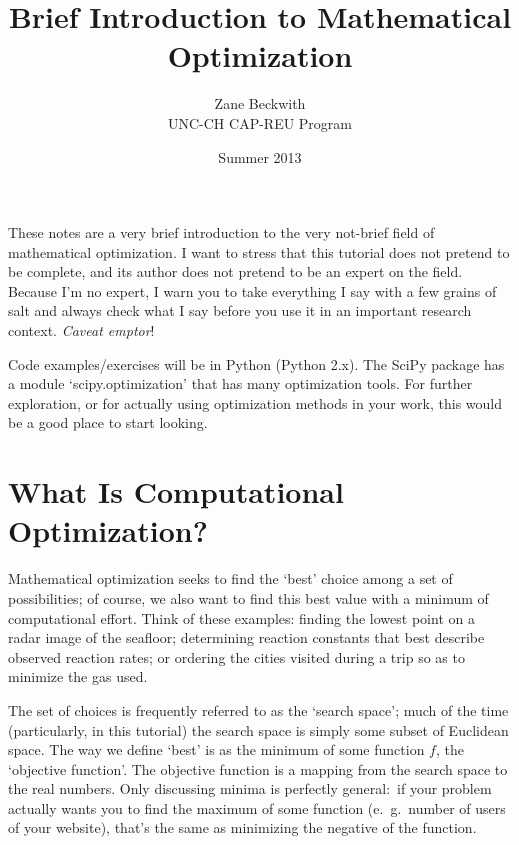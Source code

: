 \documentclass{article}
\begin{document}
\title{Brief Introduction to Mathematical Optimization}
\author{Zane Beckwith \\
UNC-CH CAP-REU Program}
\date{Summer 2013}
\maketitle

These notes are a very brief introduction to the very not-brief field of 
mathematical optimization. I want to stress that this tutorial does not
pretend to be complete, and its author does not pretend to be an expert
on the field. Because I'm no expert, I warn you to take everything I say
with a few grains of salt and always check what I say before you use
it in an important research context. \textit{Caveat emptor}!


Code examples/exercises will be in Python (Python 2.x). The SciPy package
has a module `scipy.optimization' that has many optimization tools. For further
exploration, or for actually using optimization methods in your work, 
this would be a good place to start looking.

\section*{What Is Computational Optimization?}
	Mathematical optimization seeks to find the `best' choice among
	a set of possibilities; of course, we also want to find this best
	value with a minimum of computational effort. 
	Think of these examples: finding the lowest point on a radar image
	of the seafloor; determining reaction constants that best describe
	observed reaction rates; or ordering the cities visited during a trip
	so as to minimize the gas used.

	The set of choices is frequently referred
	to as the `search space'; much of the time (particularly, in this tutorial)
	the search space is simply some subset of Euclidean space.
	The way we define `best' is as the minimum of some function $f$,
	the `objective function'. The objective function is a mapping
	from the search space to the real numbers. Only discussing minima
	is perfectly general:\ if your problem actually
	wants you to find the maximum of some function (e.\ g.\ number of users
	of your website), that's the same as minimizing the negative of the function.
\end{document}
